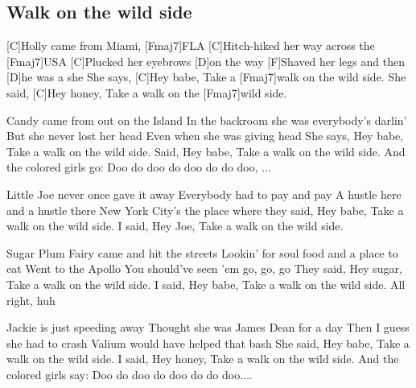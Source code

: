 \subsection*{Walk on the wild side   }
\begin{guitar}

[C]Holly came from Miami, [Fmaj7]FLA
[C]Hitch-hiked her way across the [Fmaj7]USA
[C]Plucked her eyebrows [D]on the way
[F]Shaved her legs and then [D]he was a she
She says, [C]Hey babe,
Take a [Fmaj7]walk on the wild side.
She said, [C]Hey honey,
Take a walk on the [Fmaj7]wild side.

Candy came from out on the Island
In the backroom she was everybody's darlin'
But she never lost her head
Even when she was giving head
She says, Hey babe,
Take a walk on the wild side.
Said, Hey babe,
Take a walk on the wild side.
And the colored girls go:
Doo do doo do doo do do doo, ...

Little Joe never once gave it away
Everybody had to pay and pay
A hustle here and a hustle there
New York City's the place where they said, Hey babe,
Take a walk on the wild side.
I said, Hey Joe,
Take a walk on the wild side.

Sugar Plum Fairy came and hit the streets
Lookin' for soul food and a place to eat
Went to the Apollo
You should've seen 'em go, go, go
They said, Hey sugar,
Take a walk on the wild side.
I said, Hey babe,
Take a walk on the wild side.
All right, huh

Jackie is just speeding away
Thought she was James Dean for a day
Then I guess she had to crash
Valium would have helped that bash
She said, Hey babe,
Take a walk on the wild side.
I said, Hey honey,
Take a walk on the wild side.
And the colored girls say:
Doo do doo do doo do do doo....
\end{guitar}
